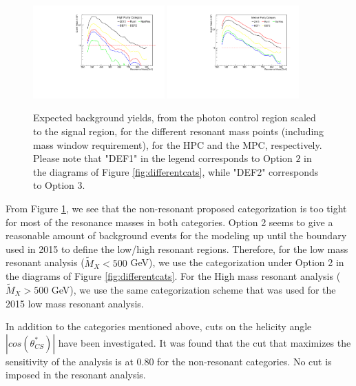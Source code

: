 \begin{figure}[thb]
  \centering
  \includegraphics[width=0.45\textwidth]{figures/sec-cats/yields_cat0}\hfil
  \includegraphics[width=0.45\textwidth]{figures/sec-cats/yields_cat1}\hfil
  \caption{Expected background yields, from the photon control region scaled to the signal region, for the different resonant mass points (including mass window requirement), for the HPC and the MPC, respectively. 
Please note that "DEF1" in the legend corresponds to Option $2$ in the diagrams of Figure \ref{fig:differentcats}, while "DEF2" corresponds to Option 3. }
  \label{fig:expbackground}
\end{figure}

From Figure \ref{fig:expbackground}, we see that the non-resonant proposed categorization is too tight for most of the resonance masses in both categories. 
Option 2 seems to give a reasonable amount of background events for the modeling up until the boundary used in 2015 to define the low/high resonant regions. 
Therefore, for the low mass resonant analysis ($\tilde{M}_{X} < 500 $ GeV), we use the categorization under Option 2 in the diagrams of Figure \ref{fig:differentcats}. 
For the High mass resonant analysis ($\tilde{M}_{X} > 500 $ GeV), we use the same categorization scheme that was used for the 2015 low mass resonant analysis. 

In addition to the categories mentioned above, cuts on the helicity angle $|cos(\theta^{*}_{CS})|$ have been investigated. 
It was found that the cut that maximizes the sensitivity of the analysis is at 0.80 for the non-resonant categories. 
No cut is imposed in the resonant analysis. 

